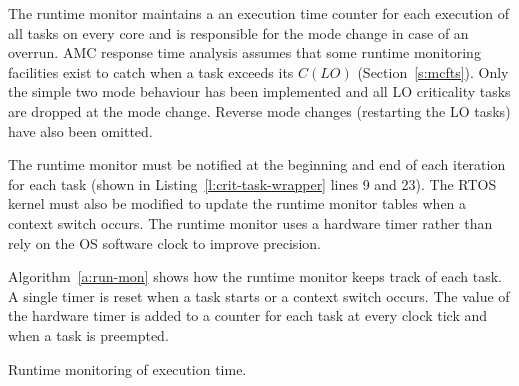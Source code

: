 	The runtime monitor maintains a an execution time counter for each execution of all tasks on every core and is responsible for the mode change in case of an overrun.
	AMC response time analysis assumes that some runtime monitoring facilities exist to catch when a task exceeds its $C(LO)$ (Section~\ref{s:mcfts}). 
	Only the simple two mode behaviour has been implemented and all LO criticality tasks are dropped at the mode change. 
	Reverse mode changes (restarting the LO tasks) have also been omitted.

	The runtime monitor must be notified at the beginning and end of each iteration for each task (shown in Listing~\ref{l:crit-task-wrapper} lines 9 and 23). 
	The RTOS kernel must also be modified to update the runtime monitor tables when a context switch occurs. 
	The runtime monitor uses a hardware timer rather than rely on the OS software clock to improve precision.
	
	Algorithm~\ref{a:run-mon} shows how the runtime monitor keeps track of each task.
	A single timer is reset when a task starts or a context switch occurs.
	The value of the hardware timer is added to a counter for each task at every clock tick and when a task is preempted.

\begin{algorithm}
	\caption{Runtime monitoring of execution time.}
	\label{a:run-mon}
\end{algorithm}
 



% 
% 
% 
	



% 
% 
% 






